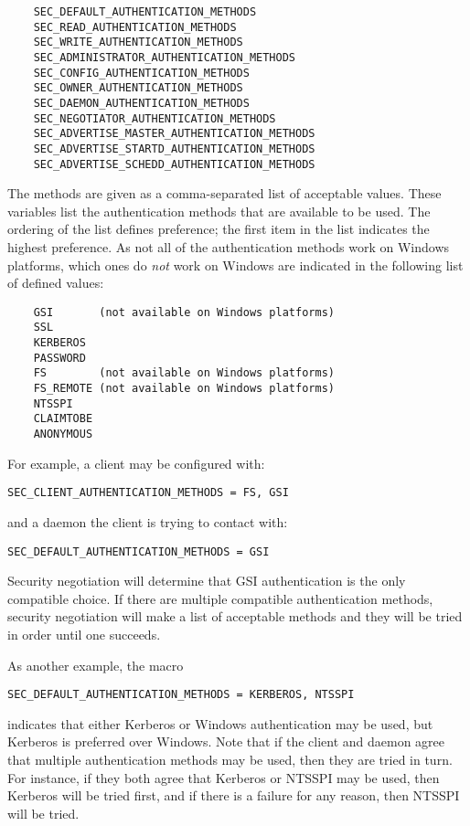 \begin{verbatim}
    SEC_DEFAULT_AUTHENTICATION_METHODS
    SEC_READ_AUTHENTICATION_METHODS
    SEC_WRITE_AUTHENTICATION_METHODS
    SEC_ADMINISTRATOR_AUTHENTICATION_METHODS
    SEC_CONFIG_AUTHENTICATION_METHODS
    SEC_OWNER_AUTHENTICATION_METHODS
    SEC_DAEMON_AUTHENTICATION_METHODS
    SEC_NEGOTIATOR_AUTHENTICATION_METHODS
    SEC_ADVERTISE_MASTER_AUTHENTICATION_METHODS
    SEC_ADVERTISE_STARTD_AUTHENTICATION_METHODS
    SEC_ADVERTISE_SCHEDD_AUTHENTICATION_METHODS
\end{verbatim}
The methods are
given as a comma-separated list of acceptable values.
These variables list the authentication methods that are available
to be used.
The ordering of the list defines preference;
the first item in the list indicates the highest preference.
As not all of the authentication methods work on Windows platforms, 
which ones do \emph{not} work on Windows are indicated in 
the following list of defined values:
\begin{verbatim}
    GSI       (not available on Windows platforms)
    SSL
    KERBEROS
    PASSWORD
    FS        (not available on Windows platforms)
    FS_REMOTE (not available on Windows platforms)
    NTSSPI
    CLAIMTOBE
    ANONYMOUS
\end{verbatim}

For example, a client may be configured with:
\begin{verbatim}
SEC_CLIENT_AUTHENTICATION_METHODS = FS, GSI
\end{verbatim}
and a daemon the client is trying to contact with:
\begin{verbatim}
SEC_DEFAULT_AUTHENTICATION_METHODS = GSI
\end{verbatim}

Security negotiation will determine that GSI authentication is the only
compatible choice. If there are multiple compatible authentication
methods, security negotiation will make a list of acceptable methods and
they will be tried in order until one succeeds. 

As another example, the macro
\begin{verbatim}
SEC_DEFAULT_AUTHENTICATION_METHODS = KERBEROS, NTSSPI
\end{verbatim}
indicates that either Kerberos or Windows authentication may be used,
but Kerberos is preferred over Windows.
Note that if the client and daemon agree that multiple authentication
methods may be used, then they are tried in turn. For instance, if
they both agree that Kerberos or NTSSPI may be used, then Kerberos
will be tried first, and if there is a failure for any reason, then
NTSSPI will be tried. 

